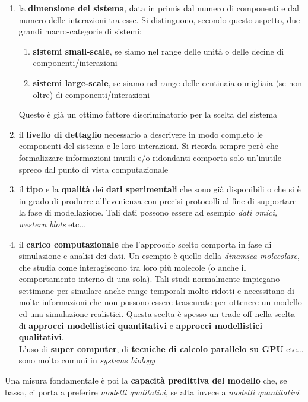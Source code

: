 \documentclass[a4paper,12pt, oneside]{book}
\begin{document}
\begin{enumerate}
  \item la \textbf{dimensione del sistema}, data in primis dal numero di
  componenti e dal numero delle interazioni tra esse. Si distinguono, secondo
  questo aspetto, due grandi macro-categorie di sistemi:
  \begin{enumerate}
    \item \textbf{sistemi small-scale}, se siamo nel range delle unità o delle
    decine di componenti/interazioni
    \item \textbf{sistemi large-scale}, se siamo nel range delle centinaia o
    migliaia (se non oltre) di componenti/interazioni 
  \end{enumerate}
  Questo è già un ottimo fattore discriminatorio per la scelta del sistema 
  \item il \textbf{livello di dettaglio} necessario a descrivere in modo
  completo le componenti del sistema e le loro interazioni. Si ricorda sempre
  però che formalizzare informazioni inutili e/o ridondanti comporta solo
  un'inutile spreco dal punto di vista computazionale
  \item il \textbf{tipo} e la \textbf{qualità} dei \textbf{dati sperimentali}
  che sono già disponibili o che si è in grado di produrre all'evenienza con
  precisi protocolli al fine di supportare la fase di modellazione. Tali dati
  possono essere ad esempio \textit{dati omici, western blots} etc$\ldots$
  \item il \textbf{carico computazionale} che l'approccio scelto comporta in
  fase di simulazione e analisi dei dati. Un esempio è quello della
  \textit{dinamica molecolare}, che studia come interagiscono tra loro più
  molecole (o anche il comportamento interno di una sola). Tali studi
  normalmente impiegano settimane per simulare anche range temporali molto
  ridotti e necessitano di molte informazioni che non possono essere trascurate
  per ottenere un modello ed una simulazione realistici. Questa scelta è spesso
  un trade-off nella scelta di \textbf{approcci modellistici quantitativi} e
  \textbf{approcci modellistici qualitativi}.\\
  L'uso di \textbf{super computer}, di \textbf{tecniche di calcolo parallelo su
    GPU} etc$\ldots$ sono molto comuni in \textit{systems biology}
\end{enumerate}
Una misura fondamentale è poi la \textbf{capacità predittiva del modello} che,
se bassa, ci porta a preferire \textit{modelli qualitativi}, se alta invece a
\textit{modelli quantitativi}.\\
\end{document}
